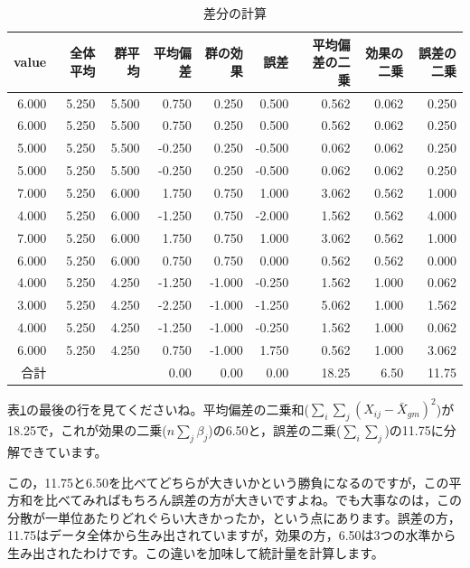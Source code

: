 \documentclass{ltjbook}
\begin{document}
\begin{table}[ht]
    \centering
    \caption{差分の計算} 
    \begin{tabular}{rrrrrrrrr}
      \hline
    value & 全体平均 & 群平均 & 平均偏差 & 群の効果 & 誤差 & 平均偏差の二乗 & 効果の二乗 & 誤差の二乗 \\ 
      \hline
      6.000 & 5.250 & 5.500 &  0.750 &  0.250 &  0.500 & 0.562 & 0.062 & 0.250 \\ 
      6.000 & 5.250 & 5.500 &  0.750 &  0.250 &  0.500 & 0.562 & 0.062 & 0.250 \\ 
      5.000 & 5.250 & 5.500 & -0.250 &  0.250 & -0.500 & 0.062 & 0.062 & 0.250 \\ 
      5.000 & 5.250 & 5.500 & -0.250 &  0.250 & -0.500 & 0.062 & 0.062 & 0.250 \\ 
      7.000 & 5.250 & 6.000 &  1.750 &  0.750 &  1.000 & 3.062 & 0.562 & 1.000 \\ 
      4.000 & 5.250 & 6.000 & -1.250 &  0.750 & -2.000 & 1.562 & 0.562 & 4.000 \\ 
      7.000 & 5.250 & 6.000 &  1.750 &  0.750 &  1.000 & 3.062 & 0.562 & 1.000 \\ 
      6.000 & 5.250 & 6.000 &  0.750 &  0.750 &  0.000 & 0.562 & 0.562 & 0.000 \\ 
      4.000 & 5.250 & 4.250 & -1.250 & -1.000 & -0.250 & 1.562 & 1.000 & 0.062 \\ 
      3.000 & 5.250 & 4.250 & -2.250 & -1.000 & -1.250 & 5.062 & 1.000 & 1.562 \\ 
      4.000 & 5.250 & 4.250 & -1.250 & -1.000 & -0.250 & 1.562 & 1.000 & 0.062 \\ 
      6.000 & 5.250 & 4.250 &  0.750 & -1.000 &  1.750 & 0.562 & 1.000 & 3.062 \\ 
       \hline\hline
       合計 & & &  0.00 & 0.00 & 0.00 & 18.25 & 6.50 & 11.75\\\hline
    \end{tabular}
    \label{tbl::21_04}
    \end{table}
表\ref{tbl::21_04}の最後の行を見てくださいね。平均偏差の二乗和($\sum_{i}\sum_{j} (X_{ij} - \bar{X}_{gm})^2$)が18.25で，これが効果の二乗($n\sum_j \beta_j$)の6.50と，誤差の二乗($ \sum_{i}\sum_{j} $)の11.75に分解できています。

この，11.75と6.50を比べてどちらが大きいかという勝負になるのですが，この平方和を比べてみればもちろん誤差の方が大きいですよね。でも大事なのは，この分散が一単位あたりどれぐらい大きかったか，という点にあります。誤差の方，11.75はデータ全体から生み出されていますが，効果の方，6.50は3つの水準から生み出されたわけです。この違いを加味して統計量を計算します。
\end{document}
